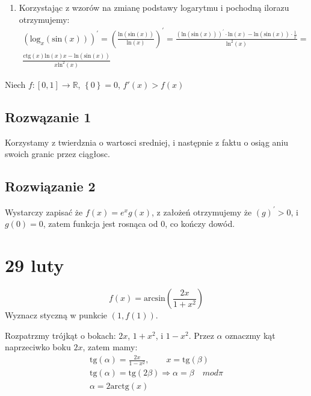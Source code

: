 \documentclass[11pt]{scrartcl}
\begin{document}
\begin{enumerate}
       \item Korzystając z wzorów na zmianę podstawy logarytmu i pochodną ilorazu otrzymujemy: 
         \begin{gather*}
           \left ( \text{log}_{x} \left ( \text{sin} \left ( x \right )  \right )  \right )^{'} = \left ( \frac{\text{ln} \left ( \text{sin} \left ( x \right )  \right ) }{\text{ln} \left ( x \right ) } \right )^{'} =
           \frac{\left ( \text{ln} \left ( \text{sin} \left ( x \right )  \right )  \right )^{'} \cdot \text{ln} \left ( x \right ) - \text{ln} \left ( \text{sin} \left ( x \right )  \right ) \cdot \frac{1}{x}}{\text{ln}^2 \left ( x \right ) } = \\ 
           \frac{\text{ctg}\left ( x \right ) \text{ln} \left ( x \right ) x - \text{ln} \left ( \text{sin} \left ( x \right )  \right )  }{x \text{ln}^2 \left ( x \right ) } 
         \end{gather*}
    \end{enumerate}
    \begin{zadanie}
        Niech $f : \left [ 0 ,1 \right ] \to \mathbb{R} $, $\left \{ 0 \right \} = 0$, $f'\left ( x \right ) > f \left ( x \right )$
    \end{zadanie}
    
    \subsection{Rozwązanie 1}
      Korzystamy z twierdznia o wartosci sredniej, i następnie z faktu o osiąg aniu swoich granic przez ciągłosc.
    \subsection{Rozwiązanie 2}
      Wystarczy zapisać że $f(x) = e^{x} g(x)$, z założeń otrzymujemy że $\left ( g \right )^{'} > 0$, i $g(0) = 0$, zatem funkcja jest rosnąca od $0$, co kończy dowód.
  \section{29 luty}
    \begin{przykład}
        \[
            f(x) =\text{arcsin} \left ( \frac{2x}{1+x^2} \right ) 
        \]
        Wyznacz styczną w punkcie $\left ( 1, f(1) \right )$.
    \end{przykład}
    
    Rozpatrzmy trójkąt o bokach: $2x$, $1+x^2$, i $1- x^2$. Przez $\alpha$ oznaczmy kąt naprzeciwko boku $2x$, zatem mamy:
    \begin{gather*}
        \text{tg} \left ( \alpha  \right ) = \frac{2x}{1 - x^2}, \qquad x = \text{tg} \left ( \beta  \right ) \\
        \text{tg} \left ( \alpha  \right )  = \text{tg} \left ( 2 \beta \right ) \Rightarrow \alpha = \beta \quad mod \pi  \\
        \alpha = 2 \text{arctg} \left (  x \right )  
    \end{gather*}
\end{document}
